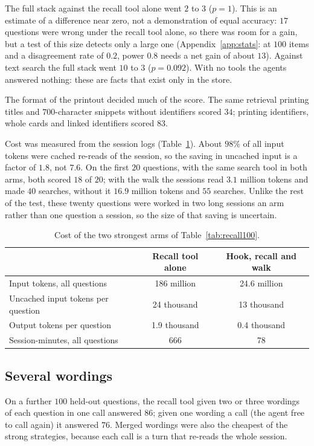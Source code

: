 The full stack against the recall tool alone went $2$ to $3$ ($p=1$). This is an estimate of a difference near zero, not a demonstration of equal accuracy: $17$ questions were wrong under the recall tool alone, so there was room for a gain, but a test of this size detects only a large one (Appendix~\ref{app:stats}: at $100$ items and a disagreement rate of $0.2$, power $0.8$ needs a net gain of about $13$). Against text search the full stack went $10$ to $3$ ($p=0.092$). With no tools the agents answered nothing: these are facts that exist only in the store.

The format of the printout decided much of the score. The same retrieval printing titles and $700$-character snippets without identifiers scored $34$; printing identifiers, whole cards and linked identifiers scored $83$.

Cost was measured from the session logs (Table~\ref{tab:recall-cost}). About $98\%$ of all input tokens were cached re-reads of the session, so the saving in uncached input is a factor of $1.8$, not $7.6$. On the first $20$ questions, with the same search tool in both arms, both scored $18$ of $20$; with the walk the sessions read $3.1$ million tokens and made $40$ searches, without it $16.9$ million tokens and $55$ searches. Unlike the rest of the test, these twenty questions were worked in two long sessions an arm rather than one question a session, so the size of that saving is uncertain.

\begin{table}[ht]
\centering\small
\begin{tabular}{lcc}
\toprule
 & Recall tool alone & Hook, recall and walk\\
\midrule
Input tokens, all questions & 186 million & 24.6 million\\
Uncached input tokens per question & 24 thousand & 13 thousand\\
Output tokens per question & 1.9 thousand & 0.4 thousand\\
Session-minutes, all questions & 666 & 78\\
\bottomrule
\end{tabular}
\caption{Cost of the two strongest arms of Table~\ref{tab:recall100}.}
\label{tab:recall-cost}
\end{table}

\subsection{Several wordings}
On a further $100$ held-out questions, the recall tool given two or three wordings of each question in one call answered $86$; given one wording a call (the agent free to call again) it answered $76$. Merged wordings were also the cheapest of the strong strategies, because each call is a turn that re-reads the whole session.


